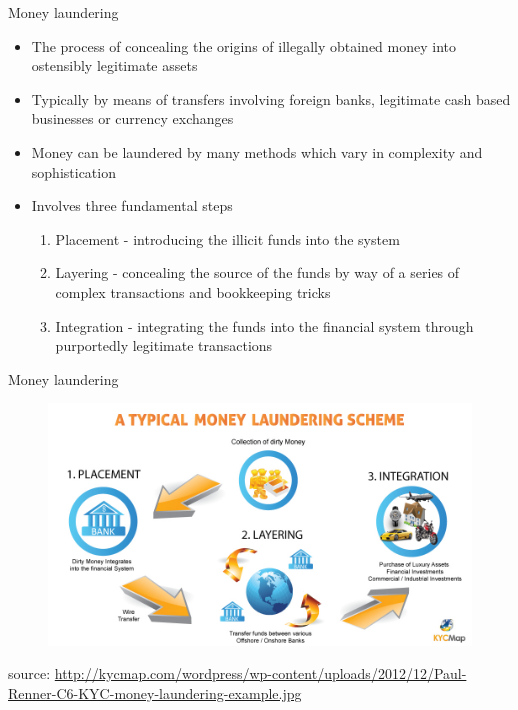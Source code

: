 \documentclass[9pt]{beamer}
\begin{document}
\begin{frame}{Money laundering}
	\begin{itemize}
		\item The process of concealing the origins of illegally obtained money into ostensibly legitimate assets
		\item Typically by means of transfers involving foreign banks, legitimate cash based businesses or currency exchanges
		\item Money can be laundered by many methods which vary in complexity and sophistication
		\item Involves three fundamental steps
		\begin{enumerate}
			\item Placement - introducing the illicit funds into the system
			\item Layering - concealing the source of the funds by way of a series of complex transactions and bookkeeping tricks
			\item Integration - integrating the funds into the financial system through purportedly legitimate transactions
		\end{enumerate}
	\end{itemize}
\end{frame}


\begin{frame}{Money laundering}
	\begin{figure}[]
		\centering
		\includegraphics  [width=4.in]{Images/kyc}
	\end{figure}
	\begin{scriptsize}
		source: \href{http://kycmap.com/what-is-money-laundering/}{http://kycmap.com/wordpress/wp-content/uploads/2012/12/Paul-Renner-C6-KYC-money-laundering-example.jpg}
	\end{scriptsize}
\end{frame}
\end{document}
